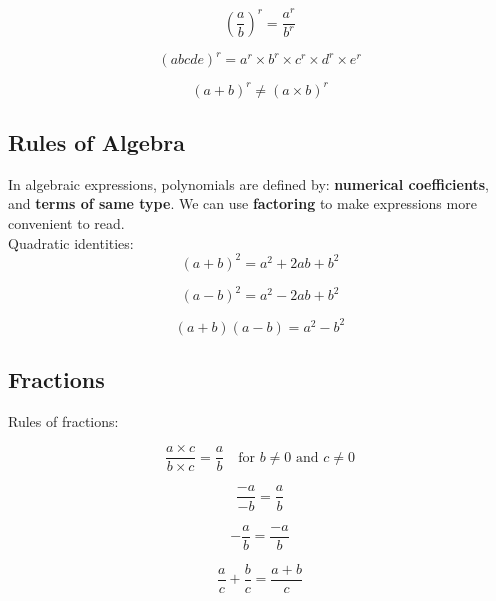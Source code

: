 \documentclass{article}
\begin{document}
\begin{equation}
  \left(\frac{a}{b}\right)^r = \frac{a^r}{b^r}
\end{equation}

\begin{equation}
  (abcde)^r = a^r \times b^r \times c^r \times d^r \times e^r
\end{equation}

\begin{equation}
  (a+b)^r \neq (a \times b)^r
\end{equation}

\subsection{Rules of Algebra}
In algebraic expressions, polynomials are defined by: \textbf{numerical coefficients}, and \textbf{terms of same type}. We can use \textbf{factoring} to make expressions more convenient to read. \\

Quadratic identities:
\begin{equation}
  (a+b)^2 = a^2 + 2ab + b^2
\end{equation}

\begin{equation}
  (a-b)^2 = a^2 - 2ab + b^2
\end{equation}

\begin{equation}
 (a+b)(a-b) = a^2 - b^2
\end{equation}

\subsection{Fractions}
Rules of fractions: 

\begin{equation}
 \frac{a\times c}{b\times c} = \frac{a}{b} \quad \text{for } b \neq 0 \text{ and } c \neq 0
\end{equation}

\begin{equation}
 \frac{-a}{-b} = \frac{a}{b} 
\end{equation}

\begin{equation}
 -\frac{a}{b} = \frac{-a}{b} 
\end{equation}

\begin{equation}
 \frac{a}{c} + \frac{b}{c} = \frac{a + b}{c} 
\end{equation}
\end{document}
